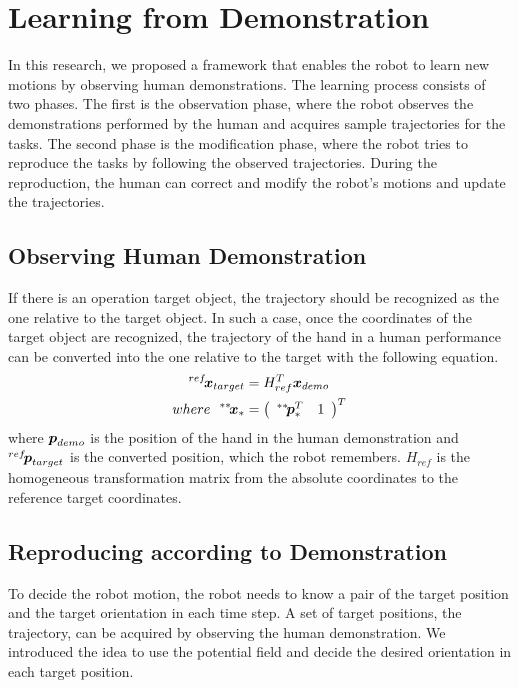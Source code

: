 \section{Learning from Demonstration}
In this research, we proposed a framework that enables the robot to learn new motions by observing human demonstrations. The learning process consists of two phases. The first is the observation phase, where the robot observes the demonstrations performed by the human and acquires sample trajectories for the tasks. The second phase is the modification phase, where the robot tries to reproduce the tasks by following the observed trajectories. During the reproduction, the human can correct and modify the robot's motions and update the trajectories.

\subsection{Observing Human Demonstration}
If there is an operation target object, the trajectory should be recognized as the one relative to the target object. In such a case, once the coordinates of the target object are recognized, the trajectory of the hand in a human performance can be converted into the one relative to the target with the following equation.
\def\vector#1{\mbox{\boldmath $#1$}}
\begin{align}
  ^{ref}\!\vector{x}_{target} &= H_{ref}^T \vector{x}_{demo} \\
  where \ \
  ^{**}\!\vector{x}_{*} &= \left(
  \begin{array}{cc}
    ^{**}\!\vector{p}_{*}^{T} & 1
  \end{array}
  \right)^T \nonumber
\end{align}
where \(\vector{p}_{demo}\) is the position of the hand in the human demonstration and \(^{ref}\!\vector{p}_{target}\) is the converted position, which the robot remembers. \(H_{ref}\) is the homogeneous transformation matrix from the absolute coordinates to the reference target coordinates.

\subsection{Reproducing according to Demonstration}
To decide the robot motion, the robot needs to know a pair of the target position and the target orientation in each time step. A set of target positions, the trajectory, can be acquired by observing the human demonstration. We introduced the idea to use the potential field and decide the desired orientation in each target position.
